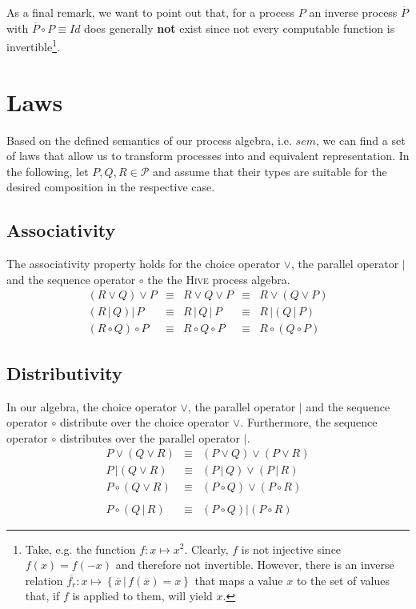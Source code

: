 As a final remark, we want to point out that, for a process $P$ an inverse process $\overline{P}$ with $\overline{P} \circ P \equiv Id$ does generally \textbf{not} exist since not every computable function is invertible\footnote{Take, e.g. the function $f \colon x \mapsto x^2$. Clearly, $f$ is not injective since $f \left( x \right) = f \left( -x \right)$ and therefore not invertible. However, there is an inverse relation $\overline{f_r} \colon x \mapsto \left\{ \overline{x} \,|\, f \left( \overline{x} \right) = x \right\}$ that maps a value $x$ to the set of values that, if $f$ is applied to them, will yield $x$.}.

\section{Laws}
\label{chp:laws}
Based on the defined semantics of our process algebra, i.e. $sem$, we can find a set of laws that allow us to transform processes into and equivalent representation. In the following, let $P, Q, R \in \mathcal{P}$ and assume that their types are suitable for the desired composition in the respective case.

\subsection{Associativity}
The associativity property holds for the choice operator $\vee$, the parallel operator $|$ and the sequence operator $\circ$ the the \textsc{Hive} process algebra.
\begin{equation*}
\begin{array}{rcccl}
  \left( R \vee Q \right) \vee P & \equiv & R \vee Q \vee P & \equiv & R \vee \left( Q \vee P \right) \\
  \left( R \,|\, Q \right) |\, P & \equiv & R \,|\, Q \,|\, P & \equiv & R \,| \left( Q \,|\, P \right) \\
  \left( R \circ Q \right) \circ P & \equiv & R \circ Q \circ P & \equiv & R \circ \left( Q \circ P \right)
\end{array}
\end{equation*}

\subsection{Distributivity}
In our algebra, the choice operator $\vee$, the parallel operator $|$ and the sequence operator $\circ$ distribute over the choice operator $\vee$. Furthermore, the sequence operator $\circ$ distributes over the parallel operator $|$.
\begin{eqnarray*}
  P \vee \left( Q \vee R \right) & \equiv & \left( P \vee Q \right) \vee \left( P \vee R \right) \\
  P \,| \left( Q \vee R \right) & \equiv & \left( P \,|\, Q \right) \vee \left( P \,|\, R \right) \\
  P \circ \left( Q \vee R \right) & \equiv & \left( P \circ Q \right) \vee \left( P \circ R \right) \\
  & & \\
  P \circ \left( Q \,|\, R \right) & \equiv & \left( P \circ Q \right) | \left( P \circ R \right)
\end{eqnarray*}

